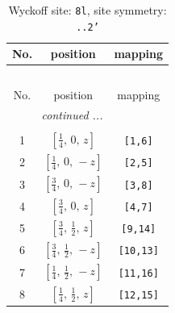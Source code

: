 \documentclass[fleqn,8pt]{jsarticle}
\begin{document}
\begin{longtable}{ccc}
\caption{Wyckoff site: {\tt 8l}, site symmetry: {\tt ..2'}}
 \\
 \hline \hline
No. & position & mapping \\ \hline \endfirsthead

\multicolumn{2}{l}{\tablename\ \thetable{}} \\
 \hline \hline
No. & position & mapping \\ \hline \endhead

 \hline \hline
\multicolumn{2}{r}{\footnotesize\it continued ...} \\ \endfoot

 \hline \hline
\multicolumn{2}{r}{} \\ \endlastfoot

1 & $\left[ \frac{1}{4},\, 0,\, z \right]$ & {\tt [1,6]} \\ \hline
2 & $\left[ \frac{1}{4},\, 0,\, - z \right]$ & {\tt [2,5]} \\ \hline
3 & $\left[ \frac{3}{4},\, 0,\, - z \right]$ & {\tt [3,8]} \\ \hline
4 & $\left[ \frac{3}{4},\, 0,\, z \right]$ & {\tt [4,7]} \\ \hline
5 & $\left[ \frac{3}{4},\, \frac{1}{2},\, z \right]$ & {\tt [9,14]} \\ \hline
6 & $\left[ \frac{3}{4},\, \frac{1}{2},\, - z \right]$ & {\tt [10,13]} \\ \hline
7 & $\left[ \frac{1}{4},\, \frac{1}{2},\, - z \right]$ & {\tt [11,16]} \\ \hline
8 & $\left[ \frac{1}{4},\, \frac{1}{2},\, z \right]$ & {\tt [12,15]} \\
\end{longtable}
\renewcommand{\arraystretch}{1.2}
\end{document}
